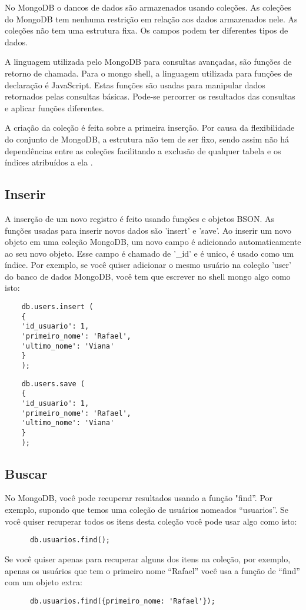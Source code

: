\documentclass[12pt]{article}
\begin{document}
No MongoDB o dancos de dados são armazenados usando coleções. As coleções do MongoDB tem nenhuma restrição em relação aos dados armazenados nele. As coleções não tem uma estrutura fixa. Os campos podem ter diferentes tipos de dados.

A linguagem utilizada pelo MongoDB para consultas avançadas, são funções de
retorno de chamada. Para o mongo shell, a linguagem utilizada para
funções de declaração é JavaScript. Estas funções são usadas para
manipular dados retornados pelas consultas básicas. Pode-se percorrer
os resultados das consultas e aplicar funções diferentes.

A criação da coleção é feita sobre a primeira
inserção. Por causa da flexibilidade do conjunto de MongoDB, a estrutura não tem de ser fixo, sendo assim não há dependências entre as coleções facilitando a exclusão de qualquer tabela e os índices atribuídos a ela \cite{boicea2012mongodb}.
\subsection{Inserir}

A inserção de um novo registro é feito usando
funções e objetos BSON. As funções usadas para inserir novos
dados são 'insert' e 'save'. Ao inserir um novo objeto em uma
coleção MongoDB, um novo campo é adicionado automaticamente
ao seu novo objeto. Esse campo é chamado de '\_id' e é unico, é usado como um índice. Por exemplo, se você quiser adicionar o
mesmo usuário na coleção 'user' do banco de dados MongoDB,
você tem que escrever no shell mongo algo como isto:

\begin{multicols}{2}
	 \begin{verbatim}
	db.users.insert (
	{  
	'id_usuario': 1,
	'primeiro_nome': 'Rafael',
	'ultimo_nome': 'Viana'
	}
	);
	\end{verbatim}

	\begin{verbatim}
	db.users.save (
	{  
	'id_usuario': 1,
	'primeiro_nome': 'Rafael',
	'ultimo_nome': 'Viana'
	}
	);
	\end{verbatim}
	
\end{multicols}
\subsection{Buscar}  
   No MongoDB, você pode recuperar resultados usando a função "find”.
   Por exemplo, supondo que temos uma coleção de usuários
   nomeados “usuarios”. Se você quiser recuperar todos os itens desta
   coleção você pode usar algo como isto:
\begin{verbatim}
	  db.usuarios.find(); 
\end{verbatim}
 Se você quiser apenas para recuperar alguns dos itens na coleção, por
 exemplo, apenas os usuários que tem o primeiro nome “Rafael” você usa
 a função de “find” com um objeto extra: 
\begin{verbatim}
	  db.usuarios.find({primeiro_nome: 'Rafael'});
\end{verbatim}
	 
\end{document}
